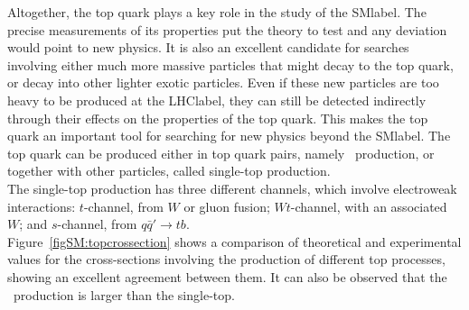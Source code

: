 Altogether, the top quark plays a key role in the study of the \acrshort{SMlabel}. The precise measurements of its properties put the theory to test and any deviation would point to new physics. It is also an excellent candidate for searches involving either much more massive particles that might decay to the top quark, or decay into other lighter exotic particles. Even if these new particles are too heavy to be produced at the \acrshort{LHClabel}, they can still be detected indirectly through their effects on the properties of the top quark. This makes the top quark an important tool for searching for new physics beyond the \acrshort{SMlabel}. The top quark can be produced either in top quark pairs, namely \ttbar\ production, or together with other particles, called single-top production.\\ %


The single-top production has three different channels, which involve electroweak interactions: $t$-channel, from $W$ or gluon fusion; $Wt$-channel, with an associated $W$; and $s$-channel, from $q\bar{q}'\to tb$.\\ %


Figure~\ref{figSM:topcrossection} shows a comparison of theoretical and experimental values for the cross-sections involving the production of different top processes, showing an excellent agreement between them. It can also be observed that the \ttbar\ production is larger than the single-top.

